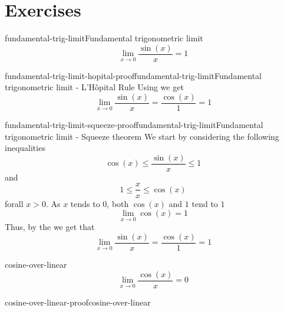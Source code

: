 \documentclass[preview]{standalone}
\begin{document}
\genpage

\section{Exercises}

\begin{snippetproposition}{fundamental-trig-limit}{Fundamental trigonometric limit}
    \[
        \lim_{x \to 0} \frac{\sin(x)}{x} = 1
    \]
\end{snippetproposition}

\begin{snippetproof}{fundamental-trig-limit-hopital-proof}{fundamental-trig-limit}{Fundamental trigonometric limit - L'Hôpital Rule}
    Using \lhopitalrule we get
    \[
        \lim_{x \to 0} \frac{\sin(x)}{x} = \frac{\cos(x)}{1} = 1
    \]
\end{snippetproof}

\begin{snippetproof}{fundamental-trig-limit-squeeze-proof}{fundamental-trig-limit}{Fundamental trigonometric limit - Squeeze theorem}
    We start by considering the following inequalities
    \[ \cos(x) \leq \frac{\sin(x)}{x} \leq 1 \]
    and
    \[ 1 \leq \frac{x}{x} \leq \cos(x) \]
    forall \(x>0\).
    As \(x\) tends to \(0\), both \(\cos(x)\) and \(1\) tend to \(1\)
    \[ \lim_{x\to 0} \cos(x)=1 \]
    Thus, by the \squeezetheorem we get that
    \[
        \lim_{x \to 0} \frac{\sin(x)}{x} = \frac{\cos(x)}{1} = 1
    \]
\end{snippetproof}

\begin{snippetproposition}{cosine-over-linear}{}
    \[
        \lim_{x \to 0} \frac{\cos(x)}{x} = 0
    \]
\end{snippetproposition}

\begin{snippetproof}{cosine-over-linear-proof}{cosine-over-linear}{}
    \todo
\end{snippetproof}
\end{document}
